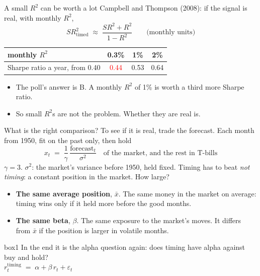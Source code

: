 \documentclass[aspectratio=169,10pt]{beamer}
\begin{document}
\begin{frame}[label=ct]{A small $R^{2}$ can be worth a lot}
Campbell and Thompson (2008): if the signal is real, with monthly $R^{2}$,
\[ SR^{2}_{\text{timed}} \;\approx\; \frac{SR^{2} + R^{2}}{1 - R^{2}} \qquad \text{(monthly units)} \]
\vskip 2pt
\begin{center}
\renewcommand{\arraystretch}{1.25}
\begin{tabular}{lccc}
\toprule
monthly $R^{2}$ & 0.3\% & 1\% & 2\% \\
\midrule
Sharpe ratio a year, from 0.40 & \textcolor{red}{0.44} & 0.53 & 0.64 \\
\bottomrule
\end{tabular}
\end{center}
\vskip 8pt
\begin{itemize}
\item The poll's answer is B. A monthly $R^{2}$ of 1\% is worth a third more Sharpe ratio.
\vskip 4pt
\item So small $R^{2}$s are not the problem. Whether they are real is.
\end{itemize}
\hfill \hyperlink{appendix_ct}{}
\end{frame}

\begin{frame}[label=compare]{What is the right comparison?}
To see if it is real, trade the forecast. Each month from 1950, fit on the past only, then hold
\[ x_{t} \;=\; \frac{1}{\gamma}\,\frac{\text{forecast}_{t}}{\sigma^{2}} \quad \text{of the market, and the rest in T-bills} \]
{\small $\gamma = 3$. $\sigma^{2}$: the market's variance before 1950, held fixed.}
\vskip 8pt
Timing has to beat \emph{not timing}: a constant position in the market. How large?
\vskip 4pt
\begin{itemize}
\item \textbf{The same average position}, $\bar{x}$. The same money in the market on average: timing wins only if it held more before the good months.
\vskip 6pt
\item \textbf{The same beta}, $\beta$. The same exposure to the market's moves. It differs from $\bar{x}$ if the position is larger in volatile months.
\end{itemize}
\vskip 8pt
\begin{beamercolorbox}[rounded=true,sep=7pt,center]{box1}
In the end it is the alpha question again: does timing have alpha against buy and hold? \\[3pt]
$r^{\text{timing}}_{t} \;=\; \alpha + \beta\, r_{t} + \varepsilon_{t}$
\end{beamercolorbox}
\end{frame}
\end{document}
